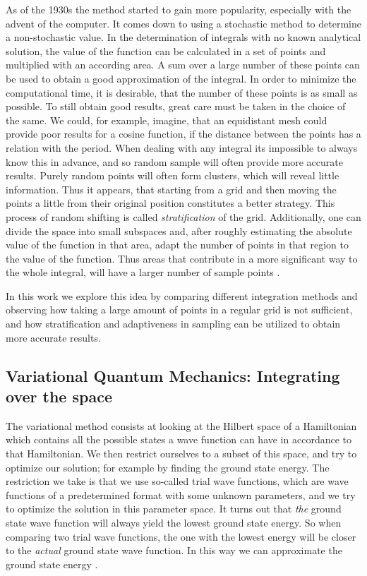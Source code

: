 As of the 1930s the method started to gain more popularity, especially with the advent of the computer. It comes down to using a stochastic method to determine a non-stochastic value.
In the determination of integrals with no known analytical solution, the value of the function can be calculated in a set of points and multiplied with an according area. A sum over a large number of these points can be used to obtain a good approximation of the integral. In order to minimize the computational time, it is desirable, that the number of these points is as small as possible. To still obtain good results, great care must be taken in the choice of the same. We could, for example, imagine, that an equidistant mesh could provide poor results for a cosine function, if the distance between the points has a relation with the period. When dealing with any integral its impossible to always know this in advance,
and so random sample will often provide more accurate results. Purely random points will often form clusters, which will reveal little information. Thus it appears, that starting from a grid and then moving the points a little from their original position constitutes a better strategy. This process of random shifting is called \textit{stratification} of the grid. Additionally, one can divide the space into small subspaces and, after roughly estimating the absolute value of the function in that area, adapt the number of points in that region to the value of the function. Thus areas that contribute in a more significant way to the whole integral, will have a larger number of sample points \cite{MCmethods}.

In this work we explore this idea by comparing different integration methods and observing how taking a large amount of points in a regular grid is not sufficient, and how stratification and adaptiveness in sampling can be utilized to obtain more accurate results.

\subsection{Variational Quantum Mechanics: Integrating over the space}
The variational method consists at looking at the Hilbert space of a Hamiltonian which contains all the possible states
a wave function can have in accordance to that Hamiltonian. We then restrict ourselves to a subset of this space,
and try to optimize our solution; for example by finding the ground state energy. The restriction we take is that
we use so-called trial wave functions, which are wave functions of a predetermined format with some unknown parameters,
and we try to optimize the solution in this parameter space. It turns out that \textit{the} ground state wave function
will always yield the lowest ground state energy. So when comparing two trial wave functions, the one with the lowest
energy will be closer to the \textit{actual} ground state wave function. In this way we can approximate the ground state
energy \cite{AdvStatMech}.


